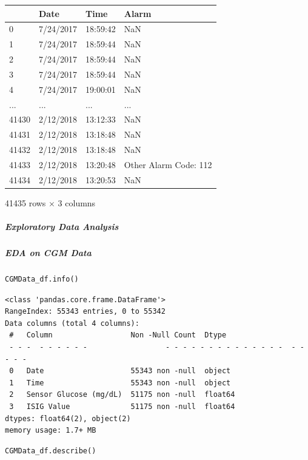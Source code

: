 \bigskip\noindent
\begin{tabular}{p{}p{}p{}p{}}
\toprule
 & Date & Time & Alarm \\
\hline
0 & 7/24/2017 & 18:59:42 & NaN \\
\hline
1 & 7/24/2017 & 18:59:44 & NaN \\
\hline
2 & 7/24/2017 & 18:59:44 & NaN \\
\hline
3 & 7/24/2017 & 18:59:44 & NaN \\
\hline
4 & 7/24/2017 & 19:00:01 & NaN \\
\hline
... & ... & ... & ... \\
\hline
41430 & 2/12/2018 & 13:12:33 & NaN \\
\hline
41431 & 2/12/2018 & 13:18:48 & NaN \\
\hline
41432 & 2/12/2018 & 13:18:48 & NaN \\
\hline
41433 & 2/12/2018 & 13:20:48 & Other Alarm Code: 112 \\
\hline
41434 & 2/12/2018 & 13:20:53 & NaN \\
\hline
\bottomrule
\end{tabular}

\bigskip

41435 rows $\times$ 3 columns

\subparagraph{Exploratory Data Analysis}

\subparagraph{EDA on CGM Data}

\begin{verbatim}
CGMData_df.info()
\end{verbatim}

\begin{verbatim}
<class 'pandas.core.frame.DataFrame'>
RangeIndex: 55343 entries, 0 to 55342
Data columns (total 4 columns):
 #   Column                  Non -Null Count  Dtype  
 - - -  - - - - - -                  - - - - - - - - - - - - - -  - - - - -  
 0   Date                    55343 non -null  object 
 1   Time                    55343 non -null  object 
 2   Sensor Glucose (mg/dL)  51175 non -null  float64
 3   ISIG Value              51175 non -null  float64
dtypes: float64(2), object(2)
memory usage: 1.7+ MB
\end{verbatim}

\begin{verbatim}
CGMData_df.describe()
\end{verbatim}

